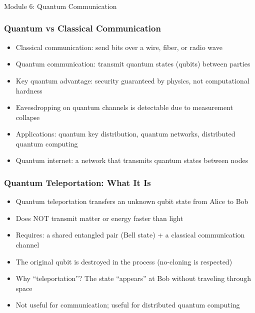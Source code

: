 
\begin{frame}[fragile]\frametitle{}
\begin{center}
{\Large Module 6: Quantum Communication}
\end{center}
\end{frame}

\begin{frame}[fragile]\frametitle{Quantum vs Classical Communication}
\begin{itemize}
\item Classical communication: send bits over a wire, fiber, or radio wave
\item Quantum communication: transmit quantum states (qubits) between parties
\item Key quantum advantage: security guaranteed by physics, not computational hardness
\item Eavesdropping on quantum channels is detectable due to measurement collapse
\item Applications: quantum key distribution, quantum networks, distributed quantum computing
\item Quantum internet: a network that transmits quantum states between nodes
\end{itemize}
\end{frame}

\begin{frame}[fragile]\frametitle{Quantum Teleportation: What It Is}
\begin{itemize}
\item Quantum teleportation transfers an unknown qubit state from Alice to Bob
\item Does NOT transmit matter or energy faster than light
\item Requires: a shared entangled pair (Bell state) + a classical communication channel
\item The original qubit is destroyed in the process (no-cloning is respected)
\item Why ``teleportation''? The state ``appears'' at Bob without traveling through space
\item Not useful for communication; useful for distributed quantum computing
\end{itemize}
\end{frame}

